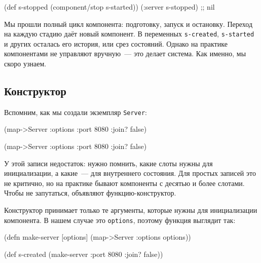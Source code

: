 \else

\begin{english}
  \begin{clojure}
(def s-stopped (component/stop s-started))
(:server s-stopped) ;; nil
  \end{clojure}
\end{english}

\fi

Мы прошли полный цикл компонента: подготовку, запуск и остановку. Переход на
каждую стадию даёт новый компонент. В переменных \verb|s-created|,
\verb|s-started| и других осталась его история, или срез состояний. Однако на
практике компонентами не управляют вручную~--- это делает система. Как именно,
мы скоро узнаем.

\subsection{Конструктор}


Вспомним, как мы создали экземпляр \verb|Server|:

\ifnarrow

\begin{english}
  \begin{clojure}
(map->Server
  {:options {:port 8080
             :join? false}})
  \end{clojure}
\end{english}

\else

\begin{english}
  \begin{clojure}
(map->Server {:options {:port 8080 :join? false}})
  \end{clojure}
\end{english}

\fi


У этой записи недостаток: нужно помнить, какие слоты нужны для инициализации, а
какие~--- для внутреннего состояния. Для простых записей это не критично, но на
практике бывают компоненты с десятью и более слотами. Чтобы не запутаться,
объявляют функцию-конструктор.

Конструктор принимает только те аргументы, которые нужны для инициализации
компонента. В нашем случае это \verb|options|, поэтому функция выглядит так:

\ifnarrow

\begin{english}
  \begin{clojure}
(defn make-server
  [options]
  (map->Server {:options options}))

(def s-created
  (make-server {:port 8080
                :join? false}))
  \end{clojure}
\end{english}

